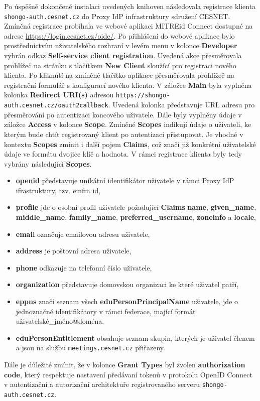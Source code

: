 \documentclass[
  printed, %
  twoside, %
  table,   %
  nolof,     %
  nolot,     %
]{fithesis3}
\begin{document}
Po úspěšně dokončené instalaci uvedených knihoven následovala registrace klienta \texttt{shongo-auth.cesnet.cz} do Proxy IdP infrastruktury sdružení CESNET. Zmíněná registrace probíhala ve webové aplikaci MITREid Connect dostupné na adrese \url{https://login.cesnet.cz/oidc/}. Po přihlášení do webové aplikace bylo prostřednictvím uživatelského rozhraní v levém menu v kolonce \textbf{Developer} vybrán odkaz \textbf{Self-service client registration}. Uvedená akce přesměrovala prohlížeč na stránku s tlačítkem \textbf{New Client} sloužící pro registraci nového klienta. Po kliknutí na zmíněné tlačítko aplikace přesměrovala prohlížeč na registrační formulář s konfigurací nového klienta. V záložce \textbf{Main} byla vyplněna kolonka \textbf{Redirect URI(s)} adresou \texttt{https://shongo-auth.cesnet.cz/oauth2callback}. Uvedená kolonka představuje URL adresu pro přesměrování po autentizaci koncového uživatele. Dále byly vyplněny údaje v záložce \textbf{Access} v kolonce \textbf{Scope}. Zmíněné \textbf{Scopes} indikují údaje o uživateli, ke kterým bude chtít registrovaný klient po autentizaci přistupovat. Je vhodné v kontextu \textbf{Scopes} zmínit i další pojem \textbf{Claims}, což značí již konkrétní uživatelské údaje ve formátu dvojice klíč a hodnota. V rámci registrace klienta byly tedy vybrány následující \textbf{Scopes}.

\begin{itemize}
    \item \textbf{openid} představuje unikátní identifikátor uživatele v rámci Proxy IdP ifrastruktury, tzv. einfra id,
    \item \textbf{profile} jde o osobní profil uživatele požadující \textbf{Claims} \textbf{name}, \textbf{given\_name}, \textbf{middle\_name}, \textbf{family\_name}, \textbf{preferred\_username}, \textbf{zoneinfo} a \textbf{locale},
    \item \textbf{email} označuje emailovou adresu uživatele,
    \item \textbf{address} je poštovní adresa uživatele,
    \item \textbf{phone} odkazuje na telefonní číslo uživatele,
    
    \item \textbf{organization} představuje domovskou organizaci ke které uživatel patří,
    \item \textbf{eppns} značí seznam všech \textbf{eduPersonPrincipalName} uživatele, jde o jednoznačné identifikátory v rámci federace, mající formát uživatelské\_jméno@doména,  
    \item \textbf{eduPersonEntitlement} obsahuje seznam skupin, kterých je uživatel členem a jsou na službu \texttt{meetings.cesnet.cz} přiřazeny.
    
\end{itemize}
Dále je důležité zmínit, že v kolonce \textbf{Grant Types} byl zvolen \textbf{authorization code}, který respektuje nastavení předávaní tokenů v protokolu OpenID Connect v autentizační a autorizační architektuře registrovaného serveru \texttt{shongo-auth.cesnet.cz}.  \par
\end{document}

